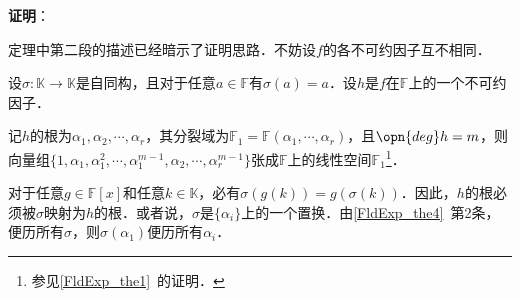 \textbf{证明}：

定理中第二段的描述已经暗示了证明思路．不妨设$f$的各不可约因子互不相同．

设$\sigma:\mathbb{K}\to\mathbb{K}$是自同构，且对于任意$a\in\mathbb{F}$有$\sigma(a)=a$．设$h$是$f$在$\mathbb{F}$上的一个不可约因子．

记$h$的根为$\alpha_1, \alpha_2, \cdots, \alpha_r$，其分裂域为$\mathbb{F}_1=\mathbb{F}(\alpha_1,\cdots,\alpha_r)$，且$\opn{deg}h=m$，则向量组$\{1, \alpha_1, \alpha_1^2, \cdots, \alpha_1^{m-1}, \alpha_2, \cdots, \alpha_r^{m-1}\}$张成$\mathbb{F}$上的线性空间$\mathbb{F}_1$\footnote{参见\autoref{FldExp_the1}~的证明．}．

对于任意$g\in\mathbb{F}[x]$和任意$k\in\mathbb{K}$，必有$\sigma(g(k))=g(\sigma(k))$．因此，$h$的根必须被$\sigma$映射为$h$的根．或者说，$\sigma$是$\{\alpha_i\}$上的一个置换．由\autoref{FldExp_the4}~第2条，便历所有$\sigma$，则$\sigma(\alpha_1)$便历所有$\alpha_i$．







